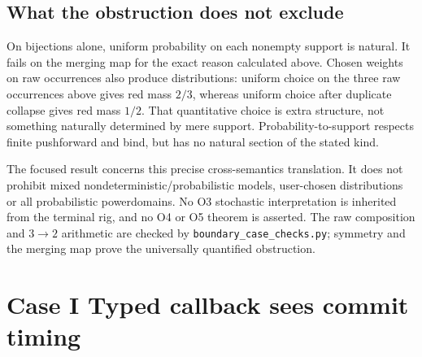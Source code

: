 \documentclass[11pt,a4paper]{article}
\theoremstyle{definition}
\begin{document}
\subsection{What the obstruction does not exclude}
On bijections alone, uniform probability on each nonempty support is
natural. It fails on the merging map for the exact reason calculated
above. Chosen weights on raw occurrences also produce distributions:
uniform choice on the three raw occurrences above gives red mass $2/3$,
whereas uniform choice after duplicate collapse gives red mass $1/2$.
That quantitative choice is extra structure, not something naturally
determined by mere support. Probability-to-support respects finite
pushforward and bind, but has no natural section of the stated kind.

The focused result concerns this precise cross-semantics translation.
It does not prohibit mixed nondeterministic/probabilistic models,
user-chosen distributions or all probabilistic powerdomains. No O3
stochastic interpretation is inherited from the terminal rig, and no O4
or O5 theorem is asserted. The raw composition and $3\to2$ arithmetic
are checked by \texttt{boundary\_case\_checks.py}; symmetry and the
merging map prove the universally quantified obstruction.


\section{Case I Typed callback sees commit timing}\label{sec:caseI}
\end{document}
